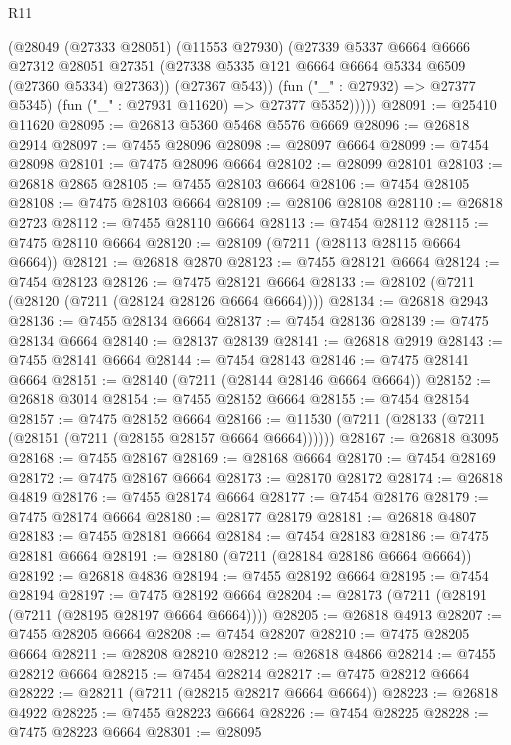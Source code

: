 \begin{lexlean}{R11}
\begin{coremodule}
            (@28049
              (@27333 @28051)
              (@11553 @27930)
              (@27339
                @5337
                @6664
                @6666
                @27312
                @28051
                @27351
                (@27338 @5335 @121 @6664 @6664 @5334 @6509 (@27360 @5334) @27363))
              (@27367 @543))
            (fun ("_" : @27932) => @27377 @5345)
            (fun ("_" : @27931 @11620) => @27377 @5352)))))
@28091 := @25410 @11620
@28095 := @26813 @5360 @5468 @5576 @6669
@28096 := @26818 @2914
@28097 := @7455 @28096
@28098 := @28097 @6664
@28099 := @7454 @28098
@28101 := @7475 @28096 @6664
@28102 := @28099 @28101
@28103 := @26818 @2865
@28105 := @7455 @28103 @6664
@28106 := @7454 @28105
@28108 := @7475 @28103 @6664
@28109 := @28106 @28108
@28110 := @26818 @2723
@28112 := @7455 @28110 @6664
@28113 := @7454 @28112
@28115 := @7475 @28110 @6664
@28120 := @28109 (@7211 (@28113 @28115 @6664 @6664))
@28121 := @26818 @2870
@28123 := @7455 @28121 @6664
@28124 := @7454 @28123
@28126 := @7475 @28121 @6664
@28133 := @28102 (@7211 (@28120 (@7211 (@28124 @28126 @6664 @6664))))
@28134 := @26818 @2943
@28136 := @7455 @28134 @6664
@28137 := @7454 @28136
@28139 := @7475 @28134 @6664
@28140 := @28137 @28139
@28141 := @26818 @2919
@28143 := @7455 @28141 @6664
@28144 := @7454 @28143
@28146 := @7475 @28141 @6664
@28151 := @28140 (@7211 (@28144 @28146 @6664 @6664))
@28152 := @26818 @3014
@28154 := @7455 @28152 @6664
@28155 := @7454 @28154
@28157 := @7475 @28152 @6664
@28166 := @11530 (@7211 (@28133 (@7211 (@28151 (@7211 (@28155 @28157 @6664 @6664))))))
@28167 := @26818 @3095
@28168 := @7455 @28167
@28169 := @28168 @6664
@28170 := @7454 @28169
@28172 := @7475 @28167 @6664
@28173 := @28170 @28172
@28174 := @26818 @4819
@28176 := @7455 @28174 @6664
@28177 := @7454 @28176
@28179 := @7475 @28174 @6664
@28180 := @28177 @28179
@28181 := @26818 @4807
@28183 := @7455 @28181 @6664
@28184 := @7454 @28183
@28186 := @7475 @28181 @6664
@28191 := @28180 (@7211 (@28184 @28186 @6664 @6664))
@28192 := @26818 @4836
@28194 := @7455 @28192 @6664
@28195 := @7454 @28194
@28197 := @7475 @28192 @6664
@28204 := @28173 (@7211 (@28191 (@7211 (@28195 @28197 @6664 @6664))))
@28205 := @26818 @4913
@28207 := @7455 @28205 @6664
@28208 := @7454 @28207
@28210 := @7475 @28205 @6664
@28211 := @28208 @28210
@28212 := @26818 @4866
@28214 := @7455 @28212 @6664
@28215 := @7454 @28214
@28217 := @7475 @28212 @6664
@28222 := @28211 (@7211 (@28215 @28217 @6664 @6664))
@28223 := @26818 @4922
@28225 := @7455 @28223 @6664
@28226 := @7454 @28225
@28228 := @7475 @28223 @6664
@28301 := @28095

\end{coremodule}
\end{lexlean}
